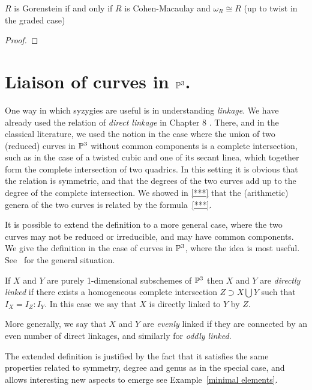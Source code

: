 
\begin{theorem} \label{canonical of Gor}
 $R$ is Gorenstein if and only if $R$ is Cohen-Macaulay and $\omega_{R} \cong R$ (up to twist in the graded case)
\end{theorem}
\begin{proof}
 
\end{proof}

\section{Liaison of curves in ${\mathbb P}^3$.}

One way in which syzygies are useful is in understanding \emph{linkage}. We have already used the relation of \emph{direct linkage} in Chapter 8 . There, and in the classical literature, we used the notion in the case where the union of two (reduced) curves in ${\mathbb P}^{3}$ without common components is a complete intersection, such as in the case of  a twisted cubic and one of its secant linea, which together form the complete intersection of two quadrics. In this setting it is obvious that the relation is symmetric, and that the degrees of the two curves add up to the degree of the complete intersection. We showed in \ref{***} that the (arithmetic) genera of the two curves is related by the formula~\ref{***}. 

It is possible to extend the definition to a more general case, where the two curves may not be reduced or irreducible, and may have common components. We  give the definition in the case of curves in ${\mathbb P}^{3}$, where the idea is most useful. See~\cite{PeskineSzpiro} for the general situation.

\begin{definition}
If $X$ and $Y$ are purely 1-dimensional subschemes of ${\mathbb P}^{3}$ then $X$ and $Y$ are \emph{directly linked} if there exists a homogeneous complete intersection $Z \supset X\bigcup Y$ such that $I_{X} = I_{Z}:I_{Y}$. In this case we say that $X$ is directly linked to $Y$ by $Z$. 

More generally, we say that $X$ and $Y$ are \emph{evenly} linked if they are
connected by an even number of direct linkages, and similarly for \emph{oddly linked}.
\end{definition}

The extended definition is justified by the fact that it satisfies the same properties related to symmetry, degree and genus as in the special case, and allows interesting new aspects to emerge see Example~\ref{minimal elements}. 

